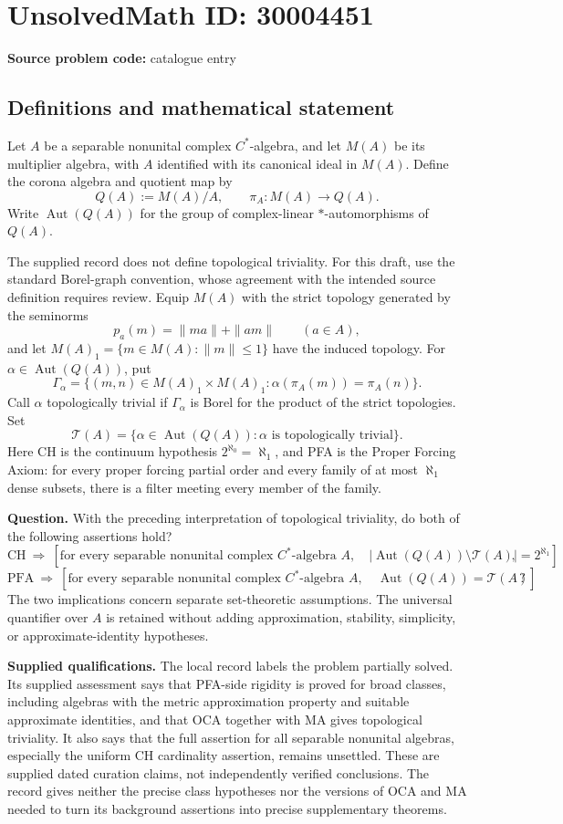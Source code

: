 \documentclass[11pt]{article}
\begin{document}
\section*{UnsolvedMath ID: 30004451}
\textbf{Source problem code:} catalogue entry
\subsection{Definitions and mathematical statement}
Let \(A\) be a separable nonunital complex \(C^*\)-algebra, and let \(M(A)\) be its multiplier algebra, with \(A\) identified with its canonical ideal in \(M(A)\). Define the corona algebra and quotient map by
\[
Q(A):=M(A)/A,\qquad \pi_A:M(A)\longrightarrow Q(A).
\]
Write \(\operatorname{Aut}(Q(A))\) for the group of complex-linear \(*\)-automorphisms of \(Q(A)\).

The supplied record does not define topological triviality. For this draft, use the standard Borel-graph convention, whose agreement with the intended source definition requires review. Equip \(M(A)\) with the strict topology generated by the seminorms
\[
p_a(m)=\|ma\|+\|am\|\qquad(a\in A),
\]
and let \(M(A)_1=\{m\in M(A):\|m\|\leq 1\}\) have the induced topology. For \(\alpha\in\operatorname{Aut}(Q(A))\), put
\[
\Gamma_\alpha=\{(m,n)\in M(A)_1\times M(A)_1:
\alpha(\pi_A(m))=\pi_A(n)\}.
\]
Call \(\alpha\) topologically trivial if \(\Gamma_\alpha\) is Borel for the product of the strict topologies. Set
\[
\mathcal T(A)=\{\alpha\in\operatorname{Aut}(Q(A)):
\alpha\text{ is topologically trivial}\}.
\]
Here CH is the continuum hypothesis \(2^{\aleph_0}=\aleph_1\), and PFA is the Proper Forcing Axiom: for every proper forcing partial order and every family of at most \(\aleph_1\) dense subsets, there is a filter meeting every member of the family.

\textbf{Question.} With the preceding interpretation of topological triviality, do both of the following assertions hold?
\[
\mathrm{CH}\ \Longrightarrow\
\left[\text{for every separable nonunital complex }C^*\text{-algebra }A,
\quad
\left|\operatorname{Aut}(Q(A))\setminus\mathcal T(A)\right|
=2^{\aleph_1}\right],
\]
\[
\mathrm{PFA}\ \Longrightarrow\
\left[\text{for every separable nonunital complex }C^*\text{-algebra }A,
\quad
\operatorname{Aut}(Q(A))=\mathcal T(A)\right]?
\]
The two implications concern separate set-theoretic assumptions. The universal quantifier over \(A\) is retained without adding approximation, stability, simplicity, or approximate-identity hypotheses.

\textbf{Supplied qualifications.} The local record labels the problem partially solved. Its supplied assessment says that PFA-side rigidity is proved for broad classes, including algebras with the metric approximation property and suitable approximate identities, and that OCA together with MA gives topological triviality. It also says that the full assertion for all separable nonunital algebras, especially the uniform CH cardinality assertion, remains unsettled. These are supplied dated curation claims, not independently verified conclusions. The record gives neither the precise class hypotheses nor the versions of OCA and MA needed to turn its background assertions into precise supplementary theorems.
\end{document}
